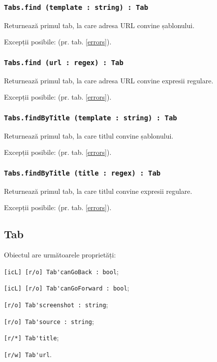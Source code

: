 \subsubsection{\lstinline|Tabs.find (template : string) : Tab|}

Returnează primul tab, la care adresa URL convine șablonului.

Excepții posibile:  (pr. tab. \ref{errors}).

\subsubsection{\lstinline|Tabs.find (url : regex) : Tab|}

Returnează primul tab, la care adresa URL convine expresii regulare.

Excepții posibile:  (pr. tab. \ref{errors}).

\subsubsection{\lstinline|Tabs.findByTitle (template : string) : Tab|}

Returnează primul tab, la care titlul convine șablonului.

Excepții posibile:  (pr. tab. \ref{errors}).

\subsubsection{\lstinline|Tabs.findByTitle (title : regex) : Tab|}

Returnează primul tab, la care titlul convine expresii regulare.

Excepții posibile:  (pr. tab. \ref{errors}).

\subsection{{\color{orange} Tab}}

Obiectul \tab{} are următoarele proprietăți:
\begin{icItems}
	\item \lstinline|[icL] [r/o] Tab'canGoBack : bool|;
	\item \lstinline|[icL] [r/o] Tab'canGoForward : bool|;
	\item \lstinline|[r/o] Tab'screenshot : string|;
	\item \lstinline|[r/o] Tab'source : string|;
	\item \lstinline|[r/*] Tab'title|;
	\item \lstinline|[r/w] Tab'url|.
\end{icItems}

